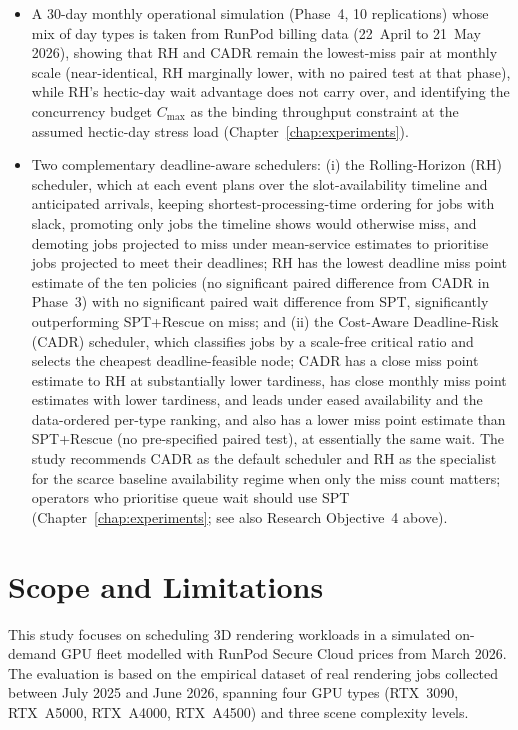 \begin{itemize}
\item A 30-day monthly operational simulation (Phase~4, 10 replications) whose mix of day types is taken from RunPod billing data (22~April to 21~May 2026), showing that RH and CADR remain the lowest-miss pair at monthly scale (near-identical, RH marginally lower, with no paired test at that phase), while RH's hectic-day wait advantage does not carry over, and identifying the concurrency budget $C_{\max}$ as the binding throughput constraint at the assumed hectic-day stress load (Chapter~\ref{chap:experiments}).

\item Two complementary deadline-aware schedulers: (i) the Rolling-Horizon (RH) scheduler, which at each event plans over the slot-availability timeline and anticipated arrivals, keeping shortest-processing-time ordering for jobs with slack, promoting only jobs the timeline shows would otherwise miss, and demoting jobs projected to miss under mean-service estimates to prioritise jobs projected to meet their deadlines; RH has the lowest deadline miss point estimate of the ten policies (no significant paired difference from CADR in Phase~3) with no significant paired wait difference from SPT, significantly outperforming SPT+Rescue on miss; and (ii) the Cost-Aware Deadline-Risk (CADR) scheduler, which classifies jobs by a scale-free critical ratio and selects the cheapest deadline-feasible node; CADR has a close miss point estimate to RH at substantially lower tardiness, has close monthly miss point estimates with lower tardiness, and leads under eased availability and the data-ordered per-type ranking, and also has a lower miss point estimate than SPT+Rescue (no pre-specified paired test), at essentially the same wait. The study recommends CADR as the default scheduler and RH as the specialist for the scarce baseline availability regime when only the miss count matters; operators who prioritise queue wait should use SPT (Chapter~\ref{chap:experiments}; see also Research Objective~4 above).

\end{itemize}

\section{Scope and Limitations}
\label{sec:scope-and-limitations}

This study focuses on scheduling 3D rendering workloads in a simulated on-demand GPU fleet modelled with RunPod Secure Cloud prices from March 2026. The evaluation is based on the empirical dataset of real rendering jobs collected between July 2025 and June 2026, spanning four GPU types (RTX~3090, RTX~A5000, RTX~A4000, RTX~A4500) and three scene complexity levels.

